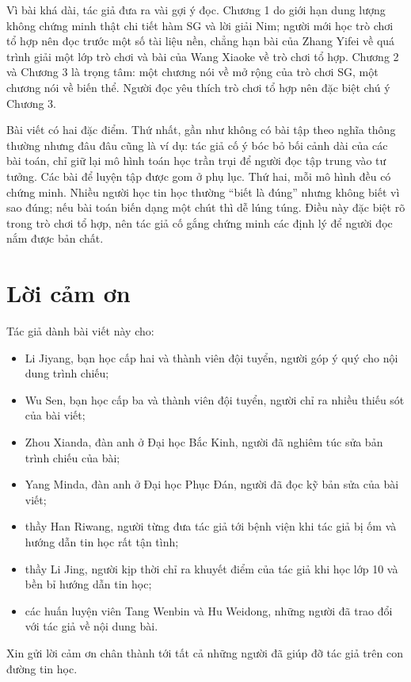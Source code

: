 \documentclass[11pt]{article}
\begin{document}
Vì bài khá dài, tác giả đưa ra vài gợi ý đọc. Chương 1 do giới hạn dung lượng
không chứng minh thật chi tiết hàm SG và lời giải Nim; người mới học trò chơi
tổ hợp nên đọc trước một số tài liệu nền, chẳng hạn bài của Zhang Yifei về
quá trình giải một lớp trò chơi và bài của Wang Xiaoke về trò chơi tổ hợp.
Chương 2 và Chương 3 là trọng tâm: một chương nói về mở rộng của trò chơi SG,
một chương nói về biến thể. Người đọc yêu thích trò chơi tổ hợp nên đặc biệt
chú ý Chương 3.

Bài viết có hai đặc điểm. Thứ nhất, gần như không có bài tập theo nghĩa thông
thường nhưng đâu đâu cũng là ví dụ: tác giả cố ý bóc bỏ bối cảnh dài của các
bài toán, chỉ giữ lại mô hình toán học trần trụi để người đọc tập trung vào
tư tưởng. Các bài để luyện tập được gom ở phụ lục. Thứ hai, mỗi mô hình đều
có chứng minh. Nhiều người học tin học thường ``biết là đúng'' nhưng không
biết vì sao đúng; nếu bài toán biến dạng một chút thì dễ lúng túng. Điều này
đặc biệt rõ trong trò chơi tổ hợp, nên tác giả cố gắng chứng minh các định lý
để người đọc nắm được bản chất.

\section*{Lời cảm ơn}

Tác giả dành bài viết này cho:
\begin{itemize}
  \item Li Jiyang, bạn học cấp hai và thành viên đội tuyển, người góp ý quý
  cho nội dung trình chiếu;
  \item Wu Sen, bạn học cấp ba và thành viên đội tuyển, người chỉ ra nhiều
  thiếu sót của bài viết;
  \item Zhou Xianda, đàn anh ở Đại học Bắc Kinh, người đã nghiêm túc sửa bản
  trình chiếu của bài;
  \item Yang Minda, đàn anh ở Đại học Phục Đán, người đã đọc kỹ bản sửa của
  bài viết;
  \item thầy Han Riwang, người từng đưa tác giả tới bệnh viện khi tác giả bị
  ốm và hướng dẫn tin học rất tận tình;
  \item thầy Li Jing, người kịp thời chỉ ra khuyết điểm của tác giả khi học
  lớp 10 và bền bỉ hướng dẫn tin học;
  \item các huấn luyện viên Tang Wenbin và Hu Weidong, những người đã trao đổi
  với tác giả về nội dung bài.
\end{itemize}

Xin gửi lời cảm ơn chân thành tới tất cả những người đã giúp đỡ tác giả trên
con đường tin học.
\end{document}
